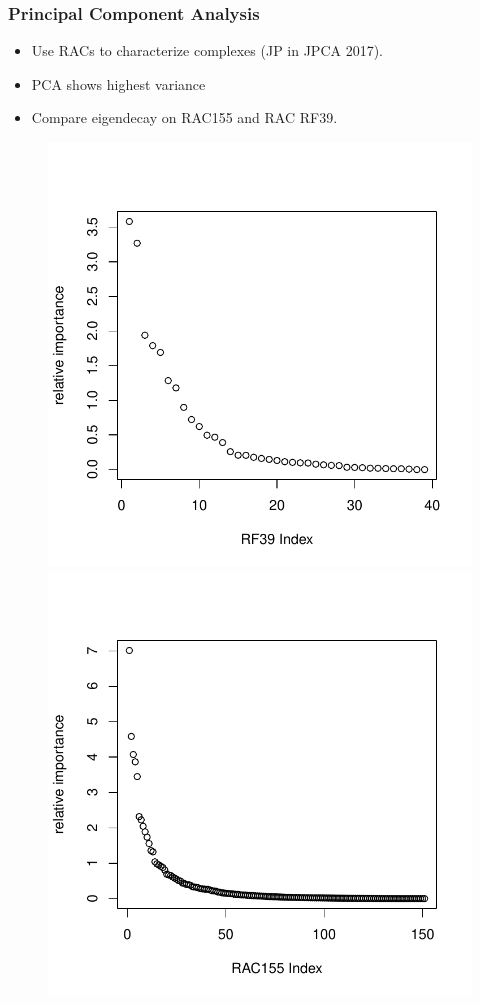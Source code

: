 \documentclass[xcolor=dvipsnames]{beamer}
\begin{document}
\begin{frame}
\frametitle{Principal Component Analysis}
\begin{itemize}
\item Use RACs to characterize complexes (JP in JPCA 2017).
\item PCA shows highest variance
\item Compare eigendecay on RAC155 and RAC RF39.
\end{itemize}

\begin{figure}[ht] 
	\begin{minipage}[b]{0.5\linewidth}
		\centering
		\includegraphics[width=.9\linewidth]{img/eigendecay39.pdf} 
	\end{minipage}%
	\begin{minipage}[b]{0.5\linewidth}
		\centering
		\includegraphics[width=.9\linewidth]{img/eigendecay155.pdf} 
	\end{minipage} 
\end{figure}
\end{frame}
\end{document}
